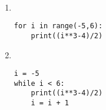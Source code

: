 \begin{correction}~
\begin{enumerate}
	\item ~
	\begin{center}
		\begin{varwidth}[t]{\textwidth}
	\begin{lstlisting}[language=iPython,linewidth = 7cm]
for i in range(-5,6):
    print((i**3-4)/2)
\end{lstlisting}
		\end{varwidth}
\end{center}
	\item ~
	\begin{center}
		\begin{varwidth}[t]{\textwidth}
	\begin{lstlisting}[language=iPython,linewidth = 6cm]
i = -5
while i < 6:
    print((i**3-4)/2)
    i = i + 1
\end{lstlisting}
		\end{varwidth}
\end{center}
\end{enumerate}
\end{correction}

